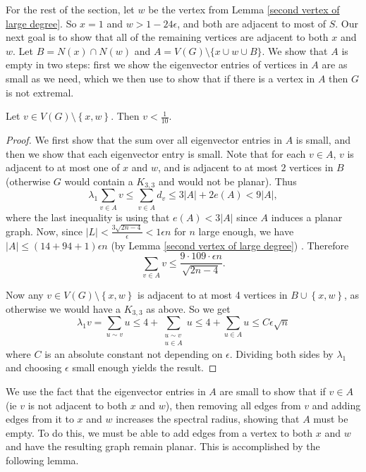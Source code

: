 For the rest of the section, let $w$ be the vertex from Lemma \ref{second vertex of large degree}. So $x=1$ and $w> 1-24\epsilon$, and both are adjacent to most of $S$. Our next goal is to show that all of the remaining vertices are adjacent to both $x$ and $w$. Let $B = N(x) \cap N(w)$ and $A = V(G) \setminus \{x\cup w \cup B\}$. We show that $A$ is empty in two steps: first we show the eigenvector entries of vertices in $A$ are as small as we need, which we then use to show that if there is a vertex in $A$ then $G$ is not extremal.

\begin{lemma}\label{eigenvector entries of A small}
Let $v\in V(G) \setminus \left\{ x,w \right\}$. Then $v < \frac{1}{10}$.
\end{lemma}

\begin{proof}
We first show that the sum over all eigenvector entries in $A$ is small, and then we show that each eigenvector entry is small. Note that for each $v\in A$, $v$ is adjacent to at most one of $x$ and $w$, and is adjacent to at most $2$ vertices in $B$ (otherwise $G$ would contain a $K_{3,3}$ and would not be planar). Thus
\[
\lambda_1\sum_{v\in A} v \leq \sum_{v\in A} d_v \leq 3|A| +2e(A) < 9|A|,
\]
where the last inequality is using that $e(A) < 3|A|$ since $A$ induces a planar graph. Now, since $|L| < \frac{3\sqrt{2n-4}}{\epsilon} < 1\epsilon n$ for $n$ large enough, we have $|A| \leq (14+94+1)\epsilon n$ (by Lemma \ref{second vertex of large degree}) . Therefore 
\[
\sum_{v\in A} v \leq \frac{9\cdot 109 \cdot \epsilon n}{\sqrt{2n-4}}.
\]

Now any $v\in V(G) \setminus \left\{ x,w \right\}$ is adjacent to at most 4 vertices in $B \cup \left\{x,w \right\}$, as otherwise we would have a $K_{3,3}$
as above.  So we get
\[
\lambda_1v = \sum_{u\sim v} u \leq 4 + \sum_{\substack{u\sim v\\ u\in A}} u \leq 4 + \sum_{u\in A} u \leq C\epsilon\sqrt{n}
\]
where $C$ is an absolute constant not depending on $\epsilon$. Dividing both sides by $\lambda_1$ and choosing $\epsilon$ small enough yields the result.
\end{proof}

We use the fact that the eigenvector entries in $A$ are small to show that if $v\in A$ (ie $v$ is not adjacent to both $x$ and $w$), then removing all edges from $v$ and adding edges from it to $x$ and $w$ increases the spectral radius, showing that $A$ must be empty. To do this, we must be able to add edges from a vertex to both $x$ and $w$ and have the resulting graph remain planar. This is accomplished by the following lemma.

